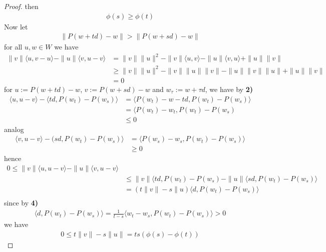 \documentclass[a4paper,11pt,fleqn]{book}
\theoremstyle{definition}
\theoremstyle{remark}
\begin{document}
\begin{proof}
	then
	\begin{align*}
		\phi(s) \geq \phi(t)
	\end{align*}
	Now let
		\begin{align*}
		\|P(w + td) - w\| > \|P(w + sd) - w\|
	\end{align*}
	for all $u, w \in W$ we have
	\begin{align*}
		\|v\| \langle u, v - u\rangle - \|u\| \langle v, u - v \rangle
		&= \|v\|\|u\|^2 - \|v\| \langle u, v\rangle - \|u\| \langle v, u\rangle + \|u\| \|v\|\\
		&\geq \|v\| \|u\|^2 - \|v\| \|u\| \|v\| - \|u\|\|v\|\|u\| + \|u\|\|v\|\\
		&= 0
	\end{align*}
	for $u:= P(w + td) - w$, $v := P(w + sd) - w$ and $w_\tau := w + \tau d$, we have by \textbf{2)}
	\begin{align*}
		\langle u, u - v\rangle - \langle td, P(w_t) - P(w_s)\rangle
		&= \langle P(w_t) - w - td, P(w_t) - P(w_s) \rangle\\
		&= \langle P(w_t) - w_t, P(w_t) - P(w_s) \\
		&\le 0
	\end{align*}
	analog
	\begin{align*}
		\langle v, u - v \rangle - (sd, P(w_t) - P(w_s) \rangle
		&= \langle P(w_s) - w_s, P(w_t) - P(w_s) \rangle \\
		&\ge 0
	\end{align*}
	hence
	\begin{align*}
		0 \le \|v\|\langle u , u - v \rangle - \|u\| \langle v, u - v \rangle\\
		&\le \|v\| \langle td, P(w_t) - P(w_s) - \|u\|\langle sd, P(w_t) - P(w_s) \rangle \\
		&= ( t \|v\| - s \|u )\langle d, P(w_t) - P(w_s) \rangle \\
	\end{align*}
	since by \textbf{4)}
	\begin{align*}
		\langle d, P(w_t) - P(w_s) \rangle = \frac{1}{t - s} \langle w_t - w_s, P(w_t) - P(w_s) \rangle > 0
	\end{align*}
	we have
	\begin{align*}
		0 \le t\|v\| - s \|u\| = ts (\phi(s) - \phi(t))
	\end{align*}
\end{proof}
\end{document}
